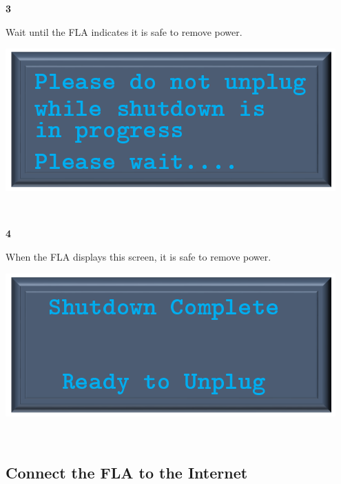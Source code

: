 \documentclass[11pt, oneside]{book}
\begin{document}
\noindent\begin{minipage}{0.45\textwidth}%
	\begin{center}
		\textbf{3}
	\end{center}
	Wait until the FLA indicates it is safe to remove power.
\end{minipage}%
\hfill%
\begin{minipage}{0.45\textwidth} 
	\includegraphics[width=\linewidth]{../media/pstricks_files/02_shutdown_in_progress}
\end{minipage}\\[\baselineskip]
\noindent\begin{minipage}{0.45\textwidth}%
	\begin{center}
		\textbf{4}
	\end{center}
	When the FLA displays this screen, it is safe to remove power.
\end{minipage}%
\hfill%
\begin{minipage}{0.45\textwidth} 
	\includegraphics[width=\linewidth]{../media/pstricks_files/02_shutdown_complete}
\end{minipage}\\[\baselineskip]

\subsection{Connect the FLA to the Internet}\label{subsec:internet_connect}
\end{document}
